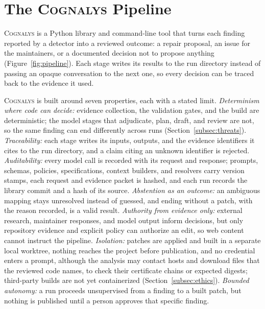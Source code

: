 \documentclass[conference]{IEEEtran}
\newcommand{\system}{\textsc{Cognalys}}
\begin{document}
\section{The \system{} Pipeline}
\label{sec:pipeline}
\label{subsec:library}

\system{} is a Python library and command-line tool that turns each finding
reported by a detector into a reviewed outcome: a repair proposal, an issue
for the maintainers, or a documented decision not to propose anything
(Figure~\ref{fig:pipeline}). Each stage writes its results to the run
directory instead of passing an opaque conversation to the next one, so every
decision can be traced back to the evidence it used.

\system{} is built around seven properties, each with a stated limit.
\emph{Determinism where code can decide:} evidence collection, the validation
gates, and the build are deterministic; the model stages that adjudicate,
plan, draft, and review are not, so the same finding can end differently
across runs (Section~\ref{subsec:threats}). \emph{Traceability:} each stage
writes its inputs, outputs, and the evidence identifiers it cites to the run
directory, and a claim citing an unknown identifier is rejected.
\emph{Auditability:} every model call is recorded with its request and
response; prompts, schemas, policies, specifications, context builders, and
resolvers carry version stamps, each request and evidence packet is hashed, and each run records the library commit and a hash of its
source. \emph{Abstention as an outcome:} an ambiguous mapping stays
unresolved instead of guessed, and ending without a patch, with the reason
recorded, is a valid result. \emph{Authority from evidence only:} external
research, maintainer responses, and model output inform decisions, but only
repository evidence and explicit policy can authorize an edit, so web
content cannot instruct the pipeline. \emph{Isolation:} patches are applied
and built in a separate local worktree, nothing reaches the project before
publication, and no credential enters a prompt, although the analysis may contact hosts and
download files that the reviewed code names, to check their certificate chains
or expected digests; third-party builds are not
yet containerized (Section~\ref{subsec:ethics}). \emph{Bounded autonomy:} a
run proceeds unsupervised from a finding to a built patch, but nothing is
published until a person approves that specific finding.
\end{document}
